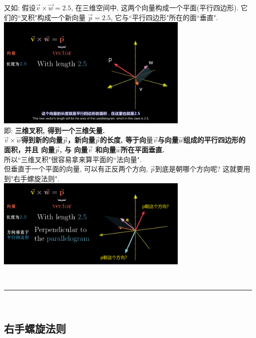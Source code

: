 \documentclass[UTF8]{ctexart}
\begin{document}
\begin{myEnvSample}
	又如: 假设$\vec{v} \times \vec{w} = 2.5$, 在三维空间中, 这两个向量构成一个平面(平行四边形). 它们的``叉积"构成一个新向量 $\vec{p}=2.5$, 它与``平行四边形"所在的面``垂直".\\
	
	\includegraphics[width=0.7\textwidth]{img/0080.png}\\
	
	即: \textbf{三维叉积, 得到一个三维矢量.}   \\
	\textbf{$\vec{v} \times \vec{w}$得到新的向量$\vec{p}$，新向量$\vec{p}$的长度, 等于向$量\vec{v}$与向量$\vec{w}$组成的平行四边形的面积，并且 向量$\vec{p}$,  与 向量$\vec{v}$ 和向量$\vec{w}$所在平面垂直.}\\
	所以``三维叉积"很容易拿来算平面的``法向量". \\
	
	但垂直于一个平面的向量, 可以有正反两个方向, $\vec{p} $到底是朝哪个方向呢? 这就要用到"右手螺旋法则".\\
	
	\includegraphics[width=0.7\textwidth]{img/0081.png}
\end{myEnvSample}


~\\
\hrule
~\\

\subsection{右手螺旋法则}
\end{document}
